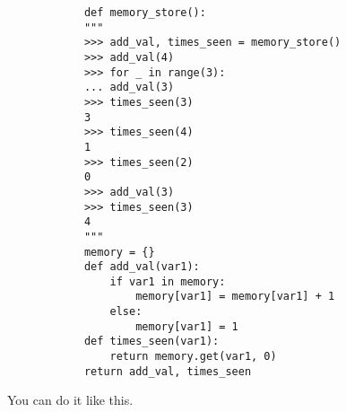 \documentclass{exam}
\begin{document}
\begin{questions}
    \begin{solution}
        \begin{lstlisting}
            def memory_store():
            """
            >>> add_val, times_seen = memory_store()
            >>> add_val(4)
            >>> for _ in range(3):
            ... add_val(3)
            >>> times_seen(3)
            3
            >>> times_seen(4)
            1
            >>> times_seen(2)
            0
            >>> add_val(3)
            >>> times_seen(3)
            4
            """
            memory = {}
            def add_val(var1):
                if var1 in memory:
                    memory[var1] = memory[var1] + 1
                else:
                    memory[var1] = 1
            def times_seen(var1):
                return memory.get(var1, 0)
            return add_val, times_seen
        \end{lstlisting}
    \end{solution}

\question You can do it like this. 

\end{questions}
\end{document}
